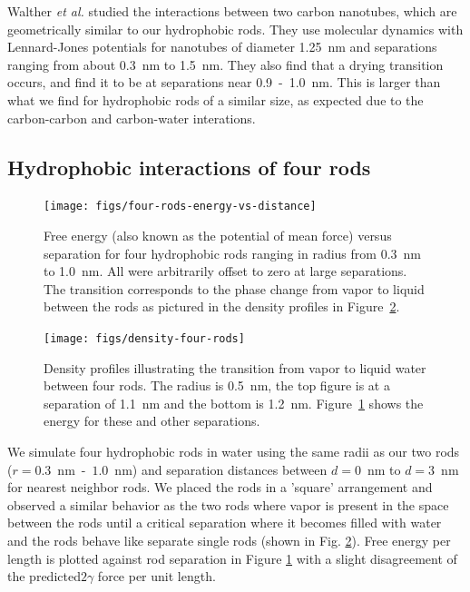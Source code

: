\documentclass[letterpaper,twocolumn,amsmath,amssymb,prb]{revtex4-1}
\begin{document}
Walther \emph{et al.}\cite{walther2004hydrodynamic} studied the interactions between two
carbon nanotubes, which are geometrically similar to our hydrophobic rods. 
They use molecular dynamics with Lennard-Jones potentials for
nanotubes of diameter 1.25~nm and separations ranging from about 0.3~nm to 1.5~nm.
They also find that a drying transition occurs, and find it to be at separations near
0.9~-~1.0~nm\cite{walther2004hydrodynamic}. This is larger than
what we find for hydrophobic rods of a similar size, as expected due to the carbon-carbon
and carbon-water interations.

\subsection{Hydrophobic interactions of four rods}

\begin{figure}
\begin{center}
\texttt{[image: figs/four-rods-energy-vs-distance]}
\end{center}
\caption{ Free energy (also known as the potential of mean force) 
versus separation for four hydrophobic rods ranging in radius from
0.3~nm to 1.0~nm.
All were arbitrarily offset to zero at large separations. The
transition corresponds to the phase change from
vapor to liquid between the rods as pictured in the density profiles in 
Figure~\ref{fig:density-four-rods}. }
\label{fig:four-rods-energy-vs-distance}
\end{figure}

\begin{figure}
\begin{center}
\texttt{[image: figs/density-four-rods]}
\end{center}
\caption{ Density profiles illustrating the transition from vapor 
to liquid water between four rods. The radius is 0.5~nm, the top figure is 
at a separation of 1.1~nm and the
bottom is 1.2~nm. Figure~\ref{fig:four-rods-energy-vs-distance} shows
the energy for these and other separations.}

\label{fig:density-four-rods}
\end{figure}

We simulate four hydrophobic rods in water using the same radii as our
two rods ($r = 0.3$~nm~-~$1.0$~nm) and
separation distances between $d = 0$~nm to $d = 3$~nm for nearest neighbor rods. We placed
the rods in a 'square' arrangement and observed a similar behavior as the two rods
where vapor is present in the space between the rods until a critical separation
where it becomes filled with water and the rods behave like separate single rods
(shown in Fig. \ref{fig:density-four-rods}).  Free energy per length
is plotted against rod separation in Figure
\ref{fig:four-rods-energy-vs-distance} with a slight disagreement of
the predicted$2\gamma$ force per unit length.
\end{document}
